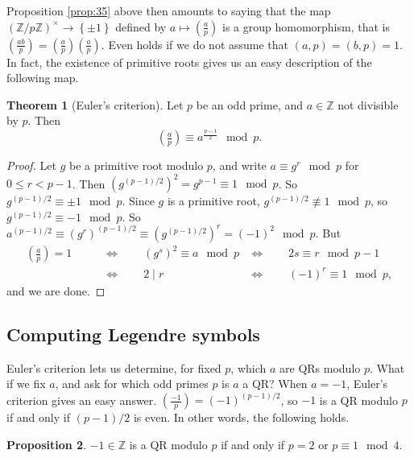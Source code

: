 \documentclass{article}
\newcommand{\Z}{\mathbb{Z}}
\newcommand{\rb}[1]{\left( #1 \right)}
\newcommand{\cb}[1]{\left\{ #1 \right\}}
\newcommand{\unit}[1]{\rb{\Z / #1\Z}^\times}
\newcommand{\legendre}[2]{\rb{\tfrac{#1}{#2}}}
\theoremstyle{definition}\newtheorem{definition}{Definition}
\theoremstyle{definition}\newtheorem{remark}[definition]{Remark}
\theoremstyle{definition}\newtheorem*{example}{Example}
\theoremstyle{definition}\newtheorem*{note}{Note}
\newtheorem{proposition}[definition]{Proposition}
\newtheorem{theorem}[definition]{Theorem}
\begin{document}
Proposition \ref{prop:35} above then amounts to saying that the map $ \unit{p} \to \cb{\pm 1} $ defined by $ a \mapsto \legendre{a}{p} $ is a group homomorphism, that is $ \legendre{ab}{p} = \legendre{a}{p}\legendre{a}{p} $. Even holds if we do not assume that $ \rb{a, p} = \rb{b, p} = 1 $. In fact, the existence of primitive roots gives us an easy description of the following map.


\begin{theorem}[Euler's criterion]
Let $ p $ be an odd prime, and $ a \in \Z $ not divisible by $ p $. Then
$$ \legendre{a}{p} \equiv a^{\tfrac{p - 1}{2}} \mod p. $$
\end{theorem}

\begin{proof}
Let $ g $ be a primitive root modulo $ p $, and write $ a \equiv g^r \mod p $ for $ 0 \le r < p - 1 $. Then $ \rb{g^{\rb{p - 1} / 2}}^2 = g^{p - 1} \equiv 1 \mod p $. So $ g^{\rb{p - 1} / 2} \equiv \pm 1 \mod p $. Since $ g $ is a primitive root, $ g^{\rb{p - 1} / 2} \not\equiv 1 \mod p $, so $ g^{\rb{p - 1} / 2} \equiv -1 \mod p $. So $ a^{\rb{p - 1} / 2} \equiv \rb{g^r}^{\rb{p - 1} / 2} \equiv \rb{g^{\rb{p - 1} / 2}}^r = \rb{-1}^2 \mod p $. But
\begin{align*}
\legendre{a}{p} = 1 \qquad
& \iff \qquad \rb{g^s}^2 \equiv a \mod p
& \iff \qquad 2s \equiv r \mod p - 1 \\
& \iff \qquad 2 \mid r
& \iff \qquad \rb{-1}^r \equiv 1 \mod p,
\end{align*}
and we are done.
\end{proof}

\subsection{Computing Legendre symbols}

Euler's criterion lets us determine, for fixed $ p $, which $ a $ are QRs modulo $ p $. What if we fix $ a $, and ask for which odd primes $ p $ is $ a $ a QR? When $ a = -1 $, Euler's criterion gives an easy answer. $ \legendre{-1}{p} = \rb{-1}^{\rb{p - 1} / 2} $, so $ -1 $ is a QR modulo $ p $ if and only if $ \rb{p - 1} / 2 $ is even. In other words, the following holds.

\begin{proposition}
$ -1 \in \Z $ is a QR modulo $ p $ if and only if $ p = 2 $ or $ p \equiv 1 \mod 4 $.
\end{proposition}
\end{document}
